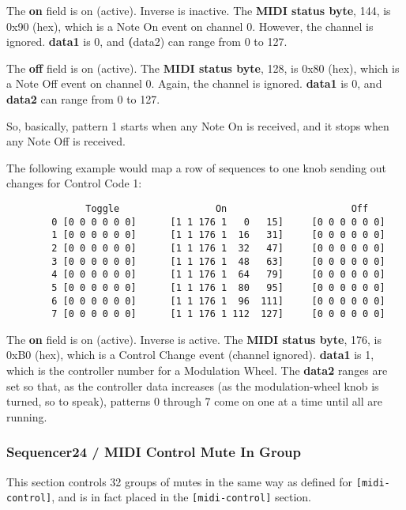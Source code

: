    The \textbf{on} field is on (active).  Inverse is inactive.  The
   \textbf{MIDI status byte}, 144, is 0x90 (hex), which is a Note On event
   on channel 0.  However, the channel is ignored.  \textbf{data1} is 0, and
   \textbf(data2) can range from 0 to 127.

   The \textbf{off} field is on (active).  The \textbf{MIDI status byte},
   128, is 0x80 (hex), which is a Note Off event on channel 0.  Again, the
   channel is ignored.  \textbf{data1} is 0, and \textbf{data2} can range
   from 0 to 127.

   So, basically, pattern 1 starts when any Note On is received, and
   it stops when any Note Off is received.

   The following example would map a row of sequences to one knob sending
   out changes for Control Code 1:

   \begin{verbatim}
	          Toggle                 On                      Off
        0 [0 0 0 0 0 0]      [1 1 176 1   0   15]     [0 0 0 0 0 0]
        1 [0 0 0 0 0 0]      [1 1 176 1  16   31]     [0 0 0 0 0 0]
        2 [0 0 0 0 0 0]      [1 1 176 1  32   47]     [0 0 0 0 0 0]
        3 [0 0 0 0 0 0]      [1 1 176 1  48   63]     [0 0 0 0 0 0]
        4 [0 0 0 0 0 0]      [1 1 176 1  64   79]     [0 0 0 0 0 0]
        5 [0 0 0 0 0 0]      [1 1 176 1  80   95]     [0 0 0 0 0 0]
        6 [0 0 0 0 0 0]      [1 1 176 1  96  111]     [0 0 0 0 0 0]
        7 [0 0 0 0 0 0]      [1 1 176 1 112  127]     [0 0 0 0 0 0]
   \end{verbatim}

   The \textbf{on} field is on (active).  Inverse is active.  The
   \textbf{MIDI status byte}, 176, is 0xB0 (hex), which is a Control Change
   event (channel ignored).  \textbf{data1} is 1, which is the controller
   number for a Modulation Wheel.  The \textbf{data2} ranges are set so
   that, as the controller data increases (as the modulation-wheel knob is
   turned, so to speak), patterns 0 through 7 come on one at a time until
   all are running.

\subsubsection{Sequencer24 / MIDI Control Mute In Group}
\label{subsubsec:seq24_rc_file_midi_control_mute_in_group}

   This section controls 32 groups of mutes in the same way as 
	defined for \texttt{[midi-control]}, and is in fact placed in the
   \texttt{[midi-control]} section.

